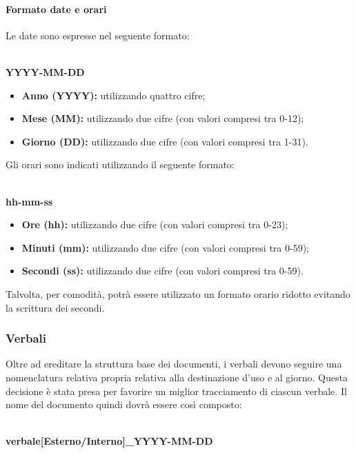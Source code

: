   \paragraph{Formato date e orari}
  Le date sono espresse nel seguente formato:\\\\ 
  \centerline{\textbf{YYYY-MM-DD}} 
  \begin{itemize}
  	\item \textbf{Anno (YYYY):} utilizzando quattro cifre;
  	\item \textbf{Mese (MM):} utilizzando due cifre (con valori compresi tra 0-12);
  	\item \textbf{Giorno (DD):} utilizzando due cifre (con valori compresi tra 1-31).
  \end{itemize}
  Gli orari sono indicati utilizzando il seguente formato:\\\\
  \centerline{\textbf{hh-mm-ss}} 
  \begin{itemize}
  	\item \textbf{Ore (hh):} utilizzando due cifre (con valori compresi tra 0-23);
  	\item \textbf{Minuti (mm):} utilizzando due cifre (con valori compresi tra 0-59);
  	\item \textbf{Secondi (ss):} utilizzando due cifre (con valori compresi tra 0-59).
  \end{itemize}
  Talvolta, per comodità, potrà essere utilizzato un formato orario ridotto evitando la scrittura dei secondi.
    
  
  \subsubsection{Verbali}
  Oltre ad ereditare la struttura base dei documenti, i verbali devono seguire
  una nomenclatura relativa propria relativa alla destinazione d'uso e al giorno.
  Questa decisione è stata presa per favorire un miglior tracciamento di ciascun verbale.
  Il nome del documento quindi dovrà essere così composto:\\\\
  \centerline{\textbf{verbale[Esterno/Interno]\_YYYY-MM-DD}} 
  

